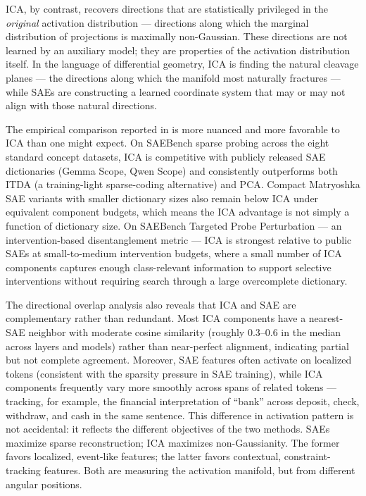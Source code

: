 \documentclass[12pt, a4paper]{article}
\theoremstyle{plain}
\theoremstyle{definition}
\theoremstyle{remark}
\begin{document}
ICA, by contrast, recovers directions that are statistically privileged in the
\emph{original} activation distribution --- directions along which the marginal
distribution of projections is maximally non-Gaussian. These directions are
not learned by an auxiliary model; they are properties of the activation
distribution itself. In the language of differential geometry, ICA is finding
the natural cleavage planes --- the directions along which the manifold most
naturally fractures --- while SAEs are constructing a learned coordinate system
that may or may not align with those natural directions.

The empirical comparison reported in \cite{liu2026icalens} is more nuanced
and more favorable to ICA than one might expect. On SAEBench sparse probing
across the eight standard concept datasets, ICA is competitive with
publicly released SAE dictionaries (Gemma Scope, Qwen Scope) and
consistently outperforms both ITDA (a training-light sparse-coding
alternative) and PCA. Compact Matryoshka SAE variants with smaller
dictionary sizes also remain below ICA under equivalent component budgets,
which means the ICA advantage is not simply a function of dictionary size.
On SAEBench Targeted Probe Perturbation --- an intervention-based
disentanglement metric --- ICA is strongest relative to public SAEs at
small-to-medium intervention budgets, where a small number of ICA components
captures enough class-relevant information to support selective interventions
without requiring search through a large overcomplete dictionary.

The directional overlap analysis also reveals that ICA and SAE are
complementary rather than redundant. Most ICA components have a nearest-SAE
neighbor with moderate cosine similarity (roughly 0.3--0.6 in the median
across layers and models) rather than near-perfect alignment, indicating
partial but not complete agreement. Moreover, SAE features often activate
on localized tokens (consistent with the sparsity pressure in SAE training),
while ICA components frequently vary more smoothly across spans of related
tokens --- tracking, for example, the financial interpretation of ``bank''
across deposit, check, withdraw, and cash in the same sentence. This
difference in activation pattern is not accidental: it reflects the different
objectives of the two methods. SAEs maximize sparse reconstruction; ICA
maximizes non-Gaussianity. The former favors localized, event-like features;
the latter favors contextual, constraint-tracking features. Both are
measuring the activation manifold, but from different angular positions.
\end{document}
